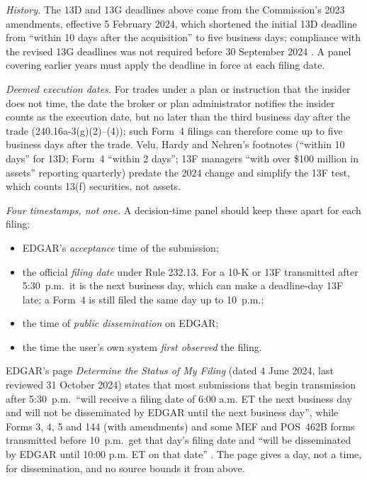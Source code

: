 \begin{qfdata}
 \emph{History.} The 13D and 13G deadlines above come from the Commission's 2023 amendments, effective 5 February 2024, which shortened the initial 13D deadline from ``within 10 days after the acquisition'' to five business days; compliance with the revised 13G deadlines was not required before 30 September 2024 \citep[88~FR 76896, 7 November 2023, pp.~76897 and~76942]{fr-2023-22678}. A panel covering earlier years must apply the deadline in force at each filing date.

\emph{Deemed execution dates.} For trades under a plan or instruction that the insider does not time, the date the broker or plan administrator notifies the insider counts as the execution date, but no later than the third business day after the trade (240.16a-3(g)(2)--(4)); such Form~4 filings can therefore come up to five business days after the trade. Velu, Hardy and Nehren's footnotes (``within 10 days'' for 13D; Form~4 ``within 2 days''; 13F managers ``with over \$100 million in assets'' reporting quarterly) \citep[chap.~1, sec.~1.4, p.~43, nn.~31--32]{s3-velu} predate the 2024 change and simplify the 13F test, which counts 13(f) securities, not assets.

 \emph{Four timestamps, not one.} A decision-time panel should keep these apart for each filing:
\begin{itemize}
\item EDGAR's \emph{acceptance} time of the submission;
\item the official \emph{filing date} under Rule 232.13. For a 10-K or 13F transmitted after 5:30~p.m.\ it is the next business day, which can make a deadline-day 13F late; a Form~4 is still filed the same day up to 10~p.m.;
\item the time of \emph{public dissemination} on EDGAR;
\item the time the user's own system \emph{first observed} the filing.
\end{itemize}
EDGAR's page \emph{Determine the Status of My Filing} (dated 4 June 2024, last reviewed 31 October 2024) states that most submissions that begin transmission after 5:30~p.m.\ ``will receive a filing date of 6:00 a.m. ET the next business day and will not be disseminated by EDGAR until the next business day'', while Forms 3, 4, 5 and 144 (with amendments) and some MEF and POS~462B forms transmitted before 10~p.m.\ get that day's filing date and ``will be disseminated by EDGAR until 10:00 p.m. ET on that date'' \citep[sec.\ \emph{Filing Date of Electronically-transmitted Submissions}]{sec-edgar-filing-status}. The page gives a day, not a time, for dissemination, and no source bounds it from above.


\end{qfdata}
